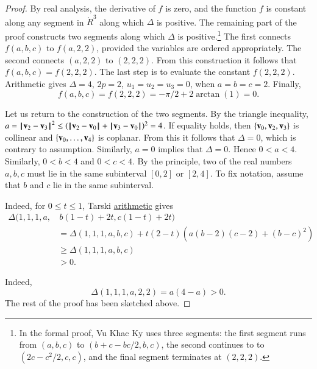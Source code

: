 \begin{proof}
By real analysis, the derivative of $f$ is zero, and the function $f$
is constant along any segment in $\ring{R}^3$ along which $\Delta$ is
positive.  The remaining part of the proof constructs two segments
along which $\Delta$ is positive.\footnote{In the formal proof, Vu
  Khac Ky uses three segments: the first segment runs from $(a,b,c)$
  to $(b+c-b c/2,b,c)$, the second continues to to $(2c - c^2/2,c,c)$,
  and the final segment terminates at $(2,2,2)$.}   The
first connects $f(a,b,c)$ to $f(a,2,2)$, provided the variables are
ordered appropriately.  The second connects $(a,2,2)$ to $(2,2,2)$.
From this construction it follows that $f(a,b,c)=f(2,2,2)$.  The last
step is to evaluate the constant $f(2,2,2)$.  Arithmetic gives
$\Delta=4$, $2p= 2$, $u_1=u_2=u_3 =0$, when $a=b=c=2$.  Finally,
\begin{displaymath}f(a,b,c)= f(2,2,2) = -\pi/2 + 2\arctan(1)
  =0.\end{displaymath}


Let us return to the construction of the two segments.  By the
triangle inequality, $a =\norm{\v_2}{\v_3}^2 \le
(\norm{\v_2}{\v_0}+\norm{\v_3}{\v_0})^2 = 4$.  If equality holds, then
$\{{\mathbf v}_0,{\mathbf v}_2,{\mathbf v}_3\}$ is collinear and $\{{\mathbf v}_0,\ldots,{\mathbf v}_4\}$ is
coplanar.  From this it follows that $\Delta=0$, which is contrary to
assumption.  Similarly, $a=0$ implies that $\Delta=0$.  Hence $0<a<4$.
Similarly, $0<b<4$ and $0<c<4$.  By the  
principle, two of the real numbers $a,b,c$ must lie in the same
subinterval $[0,2]$ or $[2,4]$.  To fix notation, assume that $b$ and
$c$ lie in the same subinterval.

  Indeed, for $0\le t \le 1$, Tarski
\hyperref[back:tarski]{arithmetic} gives
\begin{align*}
\Delta(1,1,1,a, &\,b(1-t)+2t,c(1-t)+2t)  \\
&= \Delta(1,1,1,a,b,c) + 
t (2-t) (a (b-2)(c-2) + (b-c)^2)\\
&\ge \Delta(1,1,1,a,b,c)\\
&> 0.
\end{align*}

  Indeed,
\begin{displaymath}\Delta(1,1,1,a,2,2) = a(4-a)>0.\end{displaymath}  
The rest of the proof has been sketched above.
\end{proof}
%







